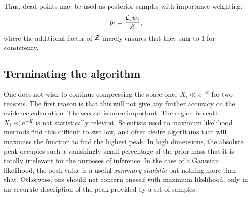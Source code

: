 Thus, dead points may be used as posterior samples with importance weighting:
\begin{equation}
  p_i = \frac{\mathcal{L}_i w_i}{\mathcal{Z}},
  \label{eqn:bay:posterior_weight}
\end{equation}
where the additional factor of $\mathcal{Z}$ merely ensures that they sum to $1$ for consistency.



\subsection{Terminating the algorithm}
One does not wish to continue compressing the space once $X_i\ll e^{-H}$ for two reasons. The first reason is that this will not give any further accuracy on the evidence calculation. The second is more important. The region beneath $X_i\ll e^{-H}$ is not statistically relevant. Scientists used to maximum likelihood methods find this difficult to swallow, and often desire algorithms that will maximise the function to find the highest peak. In high dimensions, the absolute peak occupies such a vanishingly small percentage of the prior mass that it is totally irrelevant for the purposes of inference. In the case of a Gaussian likelihood, the peak value is a useful {\em summary statistic\/} but nothing more than that. Otherwise, one should not concern oneself with maximum likelihood, only in an accurate description of the peak provided by a set of samples.


